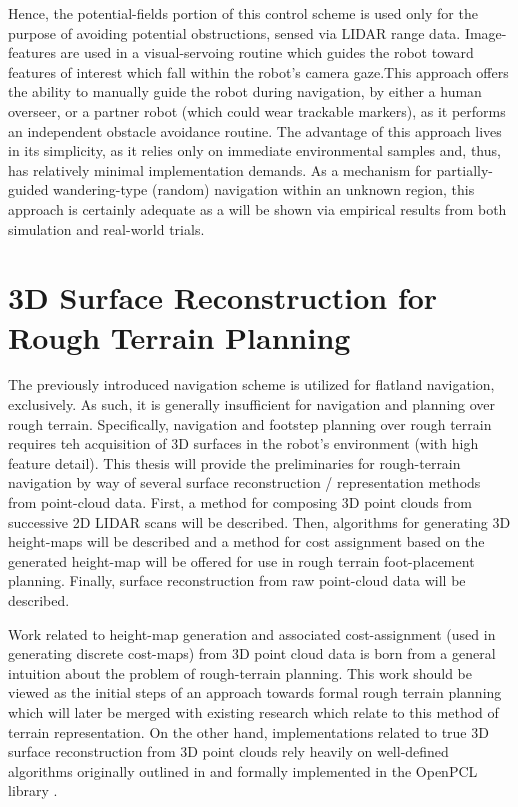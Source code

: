 		Hence, the potential-fields portion of this control scheme is used only for the purpose of avoiding potential obstructions, sensed via LIDAR range data. Image-features are used in a visual-servoing routine which guides the robot toward features of interest which fall within the robot’s camera gaze.This approach offers the ability to manually guide the robot during navigation, by either a human overseer, or a partner robot (which could wear trackable markers), as it performs an independent obstacle avoidance routine. The advantage of this approach lives in its simplicity, as it relies only on immediate environmental samples and, thus, has relatively minimal implementation demands.  As a mechanism for partially-guided wandering-type (random) navigation within an unknown region, this approach is certainly adequate as a will be shown via empirical results from both simulation and real-world trials.




	\section{3D Surface Reconstruction for Rough Terrain Planning}

		The previously introduced navigation scheme is utilized for flatland navigation, exclusively. As such, it is generally insufficient for navigation and planning over rough terrain. Specifically, navigation and footstep planning over rough terrain requires teh acquisition of 3D surfaces in the robot’s environment (with high feature detail). This thesis will provide the preliminaries for rough-terrain navigation by way of several surface reconstruction / representation methods from point-cloud data. First, a method for composing 3D point clouds from successive 2D LIDAR scans will be described. Then, algorithms for generating 3D height-maps will be described and a method for cost assignment based on the generated height-map will be offered for use in rough terrain foot-placement planning. Finally, surface reconstruction from raw point-cloud data will be described.

		Work related to height-map generation and associated cost-assignment (used in generating discrete cost-maps) from 3D point cloud data is born from a general intuition about the problem of rough-terrain planning. This work should be viewed as the initial steps of an approach towards formal rough terrain planning which will later be merged with existing research which relate to this method of terrain representation. On the other hand, implementations related to true 3D surface reconstruction from 3D point clouds rely heavily on well-defined algorithms originally outlined in \cite{Rusu2009} and formally implemented in the OpenPCL library \cite{openpcl_library}. 

